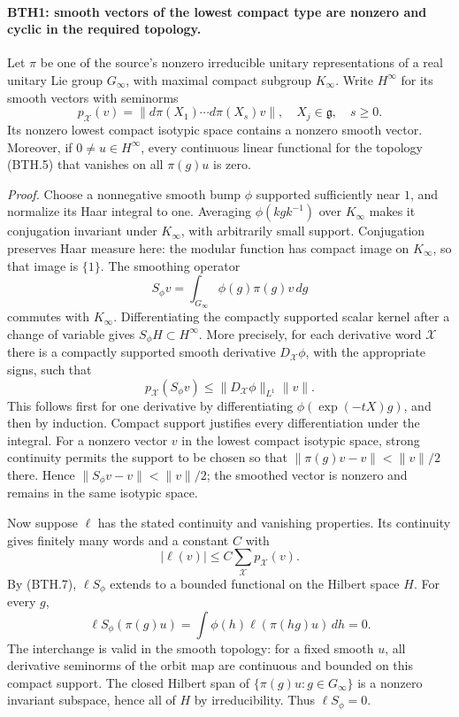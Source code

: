 \paragraph{BTH1: smooth vectors of the lowest compact type are nonzero and cyclic in the required topology.}
\label{claim:BTH1}
Let \(\pi\) be one of the source's nonzero irreducible unitary
representations of a real unitary Lie group \(G_\infty\), with
maximal compact subgroup \(K_\infty\).  Write \(H^\infty\) for its
smooth vectors with seminorms
\[
 p_{\mathcal X}(v)=\|d\pi(X_1)\cdots d\pi(X_s)v\|,
 \quad X_j\in\mathfrak g,\quad s\ge0.                            \tag{BTH.5}
\]
Its nonzero lowest compact isotypic space contains a nonzero
smooth vector.  Moreover, if \(0\ne u\in H^\infty\), every
continuous linear functional for the topology (BTH.5) that
vanishes on all \(\pi(g)u\) is zero.

\emph{Proof.}
Choose a nonnegative smooth bump \(\phi\) supported sufficiently
near \(1\), and normalize its Haar integral to one.  Averaging
\(\phi(k g k^{-1})\) over \(K_\infty\) makes it conjugation
invariant under \(K_\infty\), with arbitrarily small support.
Conjugation preserves Haar measure here: the modular function
has compact image on \(K_\infty\), so that image is \(\{1\}\).
The smoothing operator
\[
       S_\phi v=\int_{G_\infty}\phi(g)\pi(g)v\,dg
 \tag{BTH.6}
\]
commutes with \(K_\infty\).  Differentiating the compactly
supported scalar kernel after a change of variable gives
\(S_\phi H\subset H^\infty\).  More precisely, for each
derivative word \(\mathcal X\) there is a compactly supported
smooth derivative \(D_{\mathcal X}\phi\), with the appropriate
signs, such that
\[
 p_{\mathcal X}(S_\phi v)
       \le \|D_{\mathcal X}\phi\|_{L^1}\|v\|.                    \tag{BTH.7}
\]
This follows first for one derivative by differentiating
\(\phi(\exp(-tX)g)\), and then by induction.  Compact support
justifies every differentiation under the integral.
For a nonzero vector \(v\) in the lowest compact isotypic space,
strong continuity permits the support to be chosen so that
\(\|\pi(g)v-v\|<\|v\|/2\) there.  Hence
\(\|S_\phi v-v\|<\|v\|/2\); the smoothed vector is nonzero
and remains in the same isotypic space.

Now suppose \(\ell\) has the stated continuity and vanishing
properties.  Its continuity gives finitely many words and a
constant \(C\) with
\[
       |\ell(v)|\le C\sum_{\mathcal X}p_{\mathcal X}(v).
 \tag{BTH.8}
\]
By (BTH.7), \(\ell S_\phi\) extends to a bounded functional on
the Hilbert space \(H\).  For every \(g\),
\[
  \ell S_\phi(\pi(g)u)
      =\int\phi(h)\ell(\pi(hg)u)\,dh=0.                          \tag{BTH.9}
\]
The interchange is valid in the smooth topology: for a fixed
smooth \(u\), all derivative seminorms of the orbit map are
continuous and bounded on this compact support.
The closed Hilbert span of \(\{\pi(g)u:g\in G_\infty\}\) is a
nonzero invariant subspace, hence all of \(H\) by irreducibility.
Thus \(\ell S_\phi=0\).

